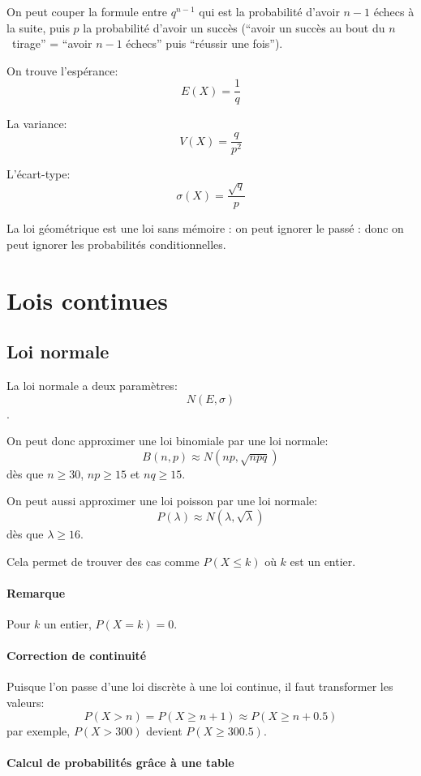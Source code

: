 \documentclass[10pt,a4paper,french]{article}
\begin{document}
On peut couper la formule entre $q^{n-1}$ qui est la probabilité d'avoir $n-1$ échecs à la suite, puis $p$ la probabilité d'avoir un succès (``avoir un succès au bout du $n$\ieme~tirage'' = ``avoir $n-1$ échecs'' puis ``réussir une fois'').

On trouve l'espérance: \[E(X) = \frac{1}{q}\]

La variance: \[V(X) = \frac{q}{p^2}\]

L'écart-type: \[\sigma(X) = \frac{\sqrt{q}}{p}\]

La loi géométrique est une loi sans mémoire : on peut ignorer le passé : donc on peut ignorer les probabilités conditionnelles.

\section{Lois continues}

\subsection{Loi normale}

La loi normale a deux paramètres: \[N(E, \sigma)\].

On peut donc approximer une loi binomiale par une loi normale: \[ B(n, p) \approx N(np, \sqrt{npq}) \] dès que $n \geq 30$, $np \geq 15$ et $nq \geq 15$.

On peut aussi approximer une loi poisson par une loi normale: \[P(\lambda) \approx N(\lambda, \sqrt{\lambda})\] dès que $\lambda \geq 16$.

Cela permet de trouver des cas comme $P(X \leq k)$ où $k$ est un entier.

\paragraph{Remarque}
Pour $k$ un entier, $P(X = k) = 0$.

\paragraph{Correction de continuité}
Puisque l'on passe d'une loi discrète à une loi continue, il faut transformer les valeurs: \[ P(X > n) = P(X \geq n+1) \approx P(X \geq n+0.5) \]
par exemple, $P(X > 300)$ devient $P(X \geq 300.5)$.

\paragraph{Calcul de probabilités grâce à une table}
\end{document}
